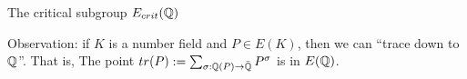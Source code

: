 \documentclass[handout]{beamer}
\begin{document}
\begin{frame}{The critical subgroup $E_{crit}(\mathbb{Q})$}








Observation: if $K$ is a number field and  $P \in E(K)$, then we can ``trace down to $\mathbb{Q}$''. That is, 
The point $tr(P) := \sum_{\sigma: \mathbb{Q}(P) \to \bar{\mathbb{Q}}} P^{\sigma}$ is in $E(\mathbb{Q})$. 

\pause 
\medskip


\end{frame}
\end{document}
